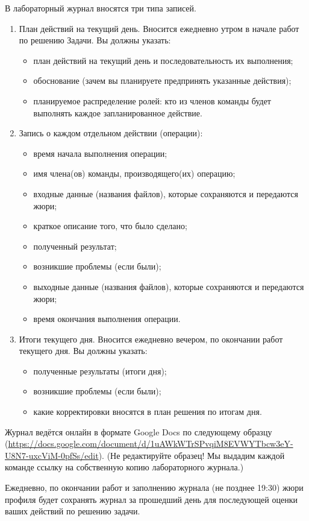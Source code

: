 В лабораторный журнал вносятся три типа записей.
\begin{enumerate}
    \item План действий на текущий день.
    Вносится ежедневно утром в начале работ по решению Задачи. Вы должны указать:
    \begin{itemize}
        \item план действий на текущий день и последовательность их выполнения;
        \item обоснование (зачем вы планируете предпринять указанные действия);
        \item планируемое распределение ролей: кто из членов команды будет выполнять каждое запланированное действие.
    \end{itemize}
    \item Запись о каждом отдельном действии (операции):
    \begin{itemize}
        \item время начала выполнения операции;
        \item имя члена(ов) команды, производящего(их) операцию;
        \item входные данные (названия файлов), которые сохраняются и передаются жюри;
        \item краткое описание того, что было сделано;
        \item полученный результат;
        \item возникшие проблемы (если были);
        \item выходные данные (названия файлов), которые сохраняются и передаются жюри;
        \item время окончания выполнения операции.
    \end{itemize}
    \item Итоги текущего дня.
    Вносится ежедневно вечером, по окончании работ текущего дня. Вы должны указать:
    \begin{itemize}
        \item полученные результаты (итоги дня);
        \item возникшие проблемы (если были);
        \item какие корректировки вносятся в план решения по итогам дня.
    \end{itemize}
\end{enumerate}

Журнал ведётся онлайн в формате Google Docs по следующему образцу (\url{https://docs.google.com/document/d/1uAWkWTrSPvqiM8EVWYTbcw3eY-U8N7-uxcViM-0pfSs/edit}). (Не редактируйте образец! Мы выдадим каждой команде ссылку на собственную копию лабораторного журнала.)

Ежедневно, по окончании работ и заполнению журнала (не позднее 19:30) жюри профиля будет сохранять журнал за прошедший день для последующей оценки ваших действий по решению задачи.